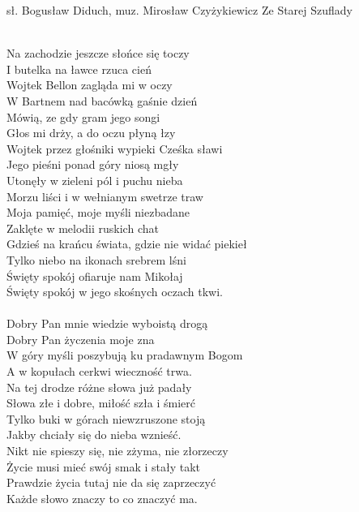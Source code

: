 {sł. Bogusław Diduch, muz. Mirosław Czyżykiewicz}
{Ze Starej Szuflady}
\begin{text}
\vin\\
\vin Na zachodzie jeszcze słońce się toczy\\
\vin I butelka na ławce rzuca cień\\
\vin Wojtek Bellon zagląda mi w oczy\\
\vin W Bartnem nad bacówką gaśnie dzień\\
\vin Mówią, ze gdy gram jego songi\\
\vin Głos mi drży, a do oczu płyną łzy\\
\vin Wojtek przez głośniki wypieki Cześka sławi\\
\vin Jego pieśni ponad góry niosą mgły\\

Utonęły w zieleni pól i puchu nieba\\
Morzu liści i w wełnianym swetrze traw\\
Moja pamięć, moje myśli niezbadane\\
Zaklęte w melodii ruskich chat\\

Gdzieś na krańcu świata, gdzie nie widać piekieł\\
Tylko niebo na ikonach srebrem lśni\\
Święty spokój ofiaruje nam Mikołaj\\
Święty spokój w jego skośnych oczach tkwi.\\

\vin\\
\vin Dobry Pan mnie wiedzie wyboistą drogą\\
\vin Dobry Pan życzenia moje zna\\
\vin W góry myśli poszybują ku pradawnym Bogom\\
\vin A w kopułach cerkwi wieczność trwa.\\

\vin Na tej drodze różne słowa już padały\\
\vin Słowa złe i dobre, miłość szła i śmierć\\
\vin Tylko buki w górach niewzruszone stoją\\
\vin Jakby chciały się do nieba wznieść.\\

Nikt nie spieszy się, nie zżyma, nie złorzeczy\\
Życie musi mieć swój smak i stały takt\\
Prawdzie życia tutaj nie da się zaprzeczyć\\
Każde słowo znaczy to co znaczyć ma.\\


\end{text}
